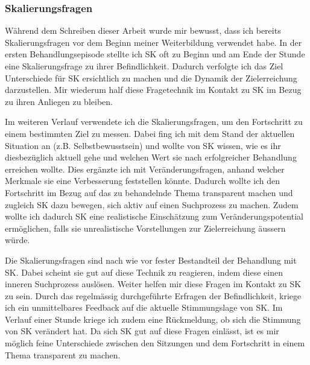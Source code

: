 \subsubsection{Skalierungsfragen} 
Während dem Schreiben dieser Arbeit wurde mir bewusst, dass ich bereits Skalierungsfragen vor dem Beginn meiner Weiterbildung verwendet habe. In der ersten Behandlungsepisode stellte ich SK oft zu Beginn und am Ende der Stunde eine Skalierungsfrage zu ihrer Befindlichkeit. Dadurch verfolgte ich das Ziel Unterschiede für SK ersichtlich zu machen und die Dynamik der Zielerreichung darzustellen. Mir wiederum half diese Fragetechnik im Kontakt zu SK im Bezug zu ihren Anliegen zu bleiben. 

Im weiteren Verlauf verwendete ich die Skalierungsfragen, um den Fortschritt zu einem bestimmten Ziel zu messen. Dabei fing ich mit dem Stand der aktuellen Situation an (z.B. Selbstbewusstsein) und wollte von SK wissen, wie es ihr diesbezüglich aktuell gehe und welchen Wert sie nach erfolgreicher Behandlung erreichen wollte. Dies ergänzte ich mit Veränderungsfragen, anhand welcher Merkmale sie eine Verbesserung feststellen könnte. Dadurch wollte ich den Fortschritt im Bezug auf das zu behandelnde Thema transparent machen und zugleich SK dazu bewegen, sich aktiv auf einen Suchprozess zu machen. Zudem wollte ich dadurch SK eine realistische Einschätzung zum Veränderungspotential ermöglichen, falls sie unrealistische Vorstellungen zur Zielerreichung äussern würde.

Die Skalierungsfragen sind nach wie vor fester Bestandteil der Behandlung mit SK. Dabei scheint sie gut auf diese Technik zu reagieren, indem diese einen inneren Suchprozess auslösen. Weiter helfen mir diese Fragen im Kontakt zu SK zu sein. Durch das regelmässig durchgeführte Erfragen der Befindlichkeit, kriege ich ein unmittelbares Feedback auf die aktuelle Stimmungslage von SK. Im Verlauf einer Stunde kriege ich zudem eine Rückmeldung, ob sich die Stimmung von SK verändert hat. Da sich SK gut auf diese Fragen einlässt, ist es mir möglich feine Unterschiede zwischen den Sitzungen und dem Fortschritt in einem Thema transparent zu machen. 

